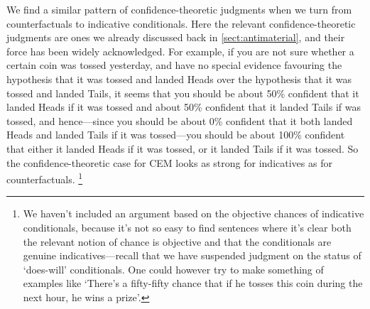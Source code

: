 \documentclass[If.tex]{subfiles}
\begin{document}
We find a similar pattern of confidence-theoretic judgments when we turn from counterfactuals to indicative conditionals. Here the relevant confidence-theoretic judgments are ones we already discussed back in \autoref{sect:antimaterial}, and their force has been widely acknowledged. For example, if you are not sure whether a certain coin was tossed yesterday, and have no special evidence favouring the hypothesis that it was tossed and landed Heads over the hypothesis that it was tossed and landed Tails, it seems that you should be about 50\% confident that it landed Heads if it was tossed and about 50\% confident that it landed Tails if was tossed, and hence---since you should be about 0\% confident that it both landed Heads and landed Tails if it was tossed---you should be about 100\% confident that either it landed Heads if it was tossed, or it landed Tails if it was tossed. So the confidence-theoretic case for CEM looks as strong for indicatives as for counterfactuals.%
\footnote{We haven't included an argument based on the objective chances of indicative conditionals, because it's not so easy to find sentences where it's clear both the relevant notion of chance is objective and that the conditionals are genuine indicatives---recall that we have suspended judgment on the status of ‘does-will’ conditionals. One could however try to make something of examples like `There's a fifty-fifty chance that if he tosses this coin during the next hour, he wins a prize'.}
\end{document}
